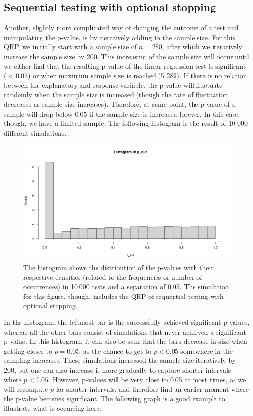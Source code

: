 \documentclass[12pt]{article}
\begin{document}
\subsection{Sequential testing with optional stopping}
    Another, slightly more complicated way of changing the outcome of a test and manipulating the p-value, is by iteratively adding to the sample size. For this QRP, we initially start with a sample size of $n=280$, after which we iteratively increase the sample size by 200. This increasing of the sample size will occur until we either find that the resulting p-value of the linear regression test is significant ($<0.05$) or when maximum sample size is reached (5 280). If there is no relation between the explanatory and response variable, the p-value will fluctuate randomly when the sample size is increased (though the rate of fluctuation decreases as sample size increases). Therefore, at some point, the p-value of a sample will drop below 0.05 if the sample size is increased forever. In this case, though, we have a limited sample. The following histogram is the result of 10 000 different simulations.

    \begin{figure}[H]
        \centering
        \includegraphics[width=1\linewidth]{figures/R_plot_sequential.png}
        \caption{The histogram shows the distribution of the p-values with their respective densities (related to the frequencies or number of occurrences) in 10.000 tests and a separation of 0.05. The simulation for this figure, though, includes the QRP of sequential testing with optional stopping.}
        \label{fig:enter-label}
    \end{figure}
    
    In the histogram, the leftmost bar is the successfully achieved significant p-values, whereas all the other bars consist of simulations that never achieved a significant p-value. In this histogram, it can also be seen that the bars decrease in size when getting closer to $p=0.05$, as the chance to get to $p<0.05$ somewhere in the sampling increases. These simulations increased the sample size iteratively by 200, but one can also increase it more gradually to capture shorter intervals where $p<0.05$. However, p-values will be very close to 0.05 at most times, as we will recompute $p$ for shorter intervals, and therefore find an earlier moment where the p-value becomes significant. The following graph is a good example to illustrate what is occurring here:
\end{document}
